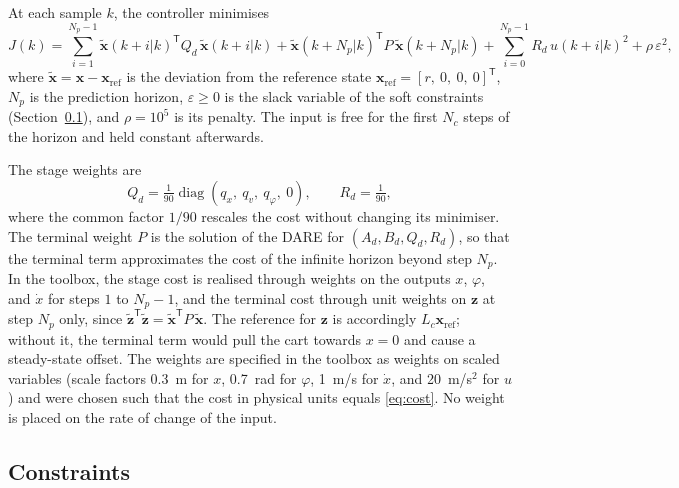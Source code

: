 At each sample $k$, the controller minimises
\begin{equation}
  J(k) = \sum_{i=1}^{N_p-1} \tilde{\mathbf{x}}(k+i|k)^{\mathsf{T}} Q_d\,
         \tilde{\mathbf{x}}(k+i|k)
       + \tilde{\mathbf{x}}(k+N_p|k)^{\mathsf{T}} P\,
         \tilde{\mathbf{x}}(k+N_p|k)
       + \sum_{i=0}^{N_p-1} R_d\, u(k+i|k)^2
       + \rho\,\varepsilon^2,
  \label{eq:cost}
\end{equation}
where $\tilde{\mathbf{x}} = \mathbf{x} - \mathbf{x}_{\mathrm{ref}}$ is the
deviation from the reference state $\mathbf{x}_{\mathrm{ref}} = [r,\ 0,\ 0,\ 0]^{\mathsf{T}}$,
$N_p$ is the prediction horizon, $\varepsilon \ge 0$ is the slack variable of
the soft constraints (Section~\ref{subsec:constraints}), and $\rho = 10^5$ is
its penalty. The input is free for the first $N_c$ steps of the horizon and
held constant afterwards.

The stage weights are
\begin{equation}
  Q_d = \tfrac{1}{90}\operatorname{diag}(q_x,\ q_v,\ q_\varphi,\ 0), \qquad
  R_d = \tfrac{1}{90},
  \label{eq:QdRd}
\end{equation}
where the common factor $1/90$ rescales the cost without changing its
minimiser. The terminal weight $P$ is the solution of the \ac{DARE} for
$(A_d, B_d, Q_d, R_d)$, so that the terminal term approximates the cost of the
infinite horizon beyond step $N_p$. In the toolbox, the stage cost is realised
through weights on the outputs $x$, $\varphi$, and $\dot{x}$ for steps $1$ to
$N_p - 1$, and the terminal cost through unit weights on $\mathbf{z}$ at step
$N_p$ only, since $\tilde{\mathbf{z}}^{\mathsf{T}}\tilde{\mathbf{z}} =
\tilde{\mathbf{x}}^{\mathsf{T}}P\,\tilde{\mathbf{x}}$. The reference for
$\mathbf{z}$ is accordingly $L_c\mathbf{x}_{\mathrm{ref}}$; without it, the
terminal term would pull the cart towards $x = 0$ and cause a steady-state
offset. The weights are specified in the toolbox as weights on scaled
variables (scale factors 0.3~m for $x$, 0.7~rad for $\varphi$, 1~m/s for
$\dot{x}$, and 20~m/s$^2$ for $u$) and were chosen such that the cost in
physical units equals \eqref{eq:cost}. No weight is placed on the rate of
change of the input.

\subsection{Constraints}
\label{subsec:constraints}

